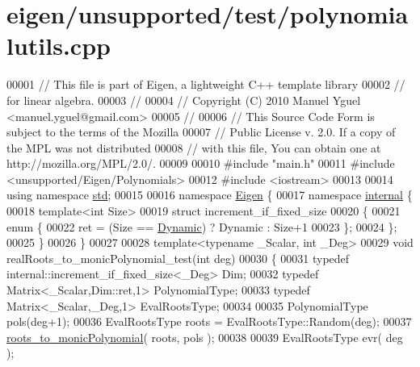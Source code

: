 \hypertarget{eigen_2unsupported_2test_2polynomialutils_8cpp_source}{}\section{eigen/unsupported/test/polynomialutils.cpp}
\label{eigen_2unsupported_2test_2polynomialutils_8cpp_source}

\begin{DoxyCode}
00001 \textcolor{comment}{// This file is part of Eigen, a lightweight C++ template library}
00002 \textcolor{comment}{// for linear algebra.}
00003 \textcolor{comment}{//}
00004 \textcolor{comment}{// Copyright (C) 2010 Manuel Yguel <manuel.yguel@gmail.com>}
00005 \textcolor{comment}{//}
00006 \textcolor{comment}{// This Source Code Form is subject to the terms of the Mozilla}
00007 \textcolor{comment}{// Public License v. 2.0. If a copy of the MPL was not distributed}
00008 \textcolor{comment}{// with this file, You can obtain one at http://mozilla.org/MPL/2.0/.}
00009 
00010 \textcolor{preprocessor}{#include "main.h"}
00011 \textcolor{preprocessor}{#include <unsupported/Eigen/Polynomials>}
00012 \textcolor{preprocessor}{#include <iostream>}
00013 
00014 \textcolor{keyword}{using namespace }\hyperlink{namespacestd}{std};
00015 
00016 \textcolor{keyword}{namespace }\hyperlink{namespace_eigen}{Eigen} \{
00017 \textcolor{keyword}{namespace }\hyperlink{namespaceinternal}{internal} \{
00018 \textcolor{keyword}{template}<\textcolor{keywordtype}{int} Size>
00019 \textcolor{keyword}{struct }increment\_if\_fixed\_size
00020 \{
00021   \textcolor{keyword}{enum} \{
00022     ret = (Size == \hyperlink{namespace_eigen_ad81fa7195215a0ce30017dfac309f0b2}{Dynamic}) ? Dynamic : Size+1
00023   \};
00024 \};
00025 \}
00026 \}
00027 
00028 \textcolor{keyword}{template}<\textcolor{keyword}{typename} \_Scalar, \textcolor{keywordtype}{int} \_Deg>
00029 \textcolor{keywordtype}{void} realRoots\_to\_monicPolynomial\_test(\textcolor{keywordtype}{int} deg)
00030 \{
00031   \textcolor{keyword}{typedef} internal::increment\_if\_fixed\_size<\_Deg>            Dim;
00032   \textcolor{keyword}{typedef} Matrix<\_Scalar,Dim::ret,1>                  PolynomialType;
00033   \textcolor{keyword}{typedef} Matrix<\_Scalar,\_Deg,1>                      EvalRootsType;
00034 
00035   PolynomialType pols(deg+1);
00036   EvalRootsType roots = EvalRootsType::Random(deg);
00037   \hyperlink{namespace_eigen_afbc3648f7ef67db3d5d04454fc1257fd}{roots\_to\_monicPolynomial}( roots, pols );
00038 
00039   EvalRootsType evr( deg );

\end{DoxyCode}
